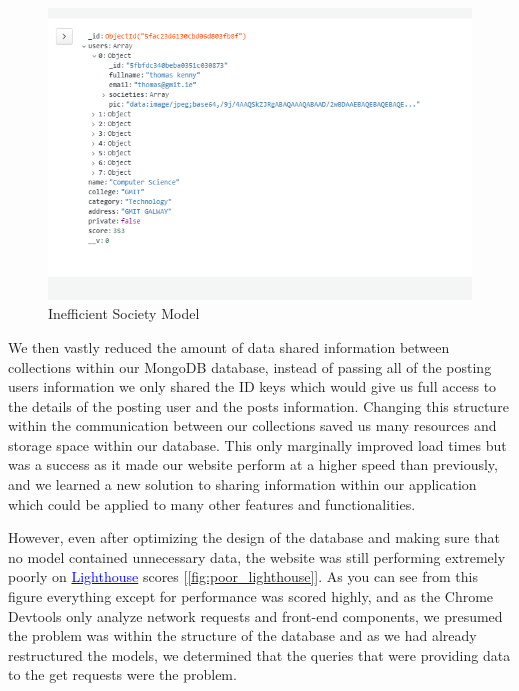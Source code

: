 \begin{figure}[H]
    \centering
    \includegraphics[scale=0.8]{img/bad_society_model_1.jpg}
    \caption{Inefficient Society Model}
    \label{fig:inefficient_society_model}
\end{figure}

We then vastly reduced the amount of data shared information between collections within our MongoDB database, instead of passing all of the posting users information we only shared the ID keys which would give us full access to the details of the posting user and the posts information.
Changing this structure within the communication between our collections saved us many resources and storage space within our database. This only marginally improved load times but was a success as it made our website perform at a higher speed than previously, and we learned a new solution to sharing information within our application which could be applied to many other features and functionalities.
\newline

However, even after optimizing the design of the database and making sure that no model contained unnecessary data, the website was still performing extremely poorly on \href{https://developers.google.com/web/tools/lighthouse/}{\textcolor{blue}{Lighthouse}} scores [\ref{fig:poor_lighthouse}]. As you can see from this figure everything except for performance was scored highly, and as the Chrome Devtools only analyze network requests and front-end components, we presumed the problem was within the structure of the database and as we had already restructured the models, we determined that the queries that were providing data to the get requests were the problem.


